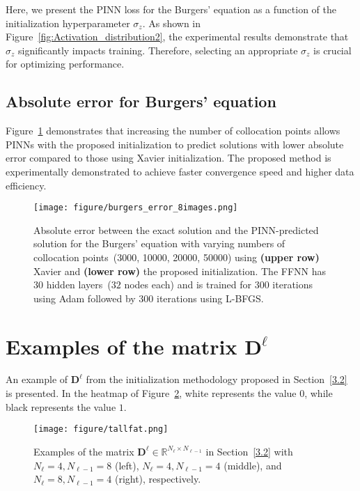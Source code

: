 \documentclass{article} \usepackage{iclr2025_conference,times}
\begin{document}
Here, we present the PINN loss for the Burgers' equation as a function of the initialization hyperparameter \( \sigma_z \). As shown in Figure~\ref{fig:Activation_distribution2}, the experimental results demonstrate that \( \sigma_z \) significantly impacts training. Therefore, selecting an appropriate \( \sigma_z \) is crucial for optimizing performance.


\subsection{Absolute error for Burgers' equation}\label{ae_burgers}

Figure~\ref{fig:burgers_8images} demonstrates that increasing the number of collocation points allows PINNs with the proposed initialization to predict solutions with lower absolute error compared to those using Xavier initialization. The proposed method is experimentally demonstrated to achieve faster convergence speed and higher data efficiency.



\begin{figure}[h!]
\centering 
\texttt{[image: figure/burgers\_error\_8images.png]}
\caption{
Absolute error between the exact solution and the PINN-predicted solution for the Burgers' equation with varying numbers of collocation points~(3000, 10000, 20000, 50000) using \textbf{(upper row)} Xavier and \textbf{(lower row)} the proposed initialization. The FFNN has 30 hidden layers~($32$ nodes each) and is trained for $300$ iterations using Adam followed by $300$ iterations using L-BFGS.}
\label{fig:burgers_8images}
\end{figure}





\section{Examples of the matrix $\mathbf{D}^{\ell}$}\label{initial}

An example of \( \mathbf{D}^{\ell} \) from the initialization methodology proposed in Section~\ref{3.2} is presented. In the heatmap of Figure~\ref{fig:fattall}, white represents the value $0$, while black represents the value $1$.

\begin{figure}[h!]
\centering 
\texttt{[image: figure/tallfat.png]}
\caption{Examples of the matrix \( \mathbf{D}^{\ell} \in \mathbb{R}^{N_{\ell} \times N_{\ell-1}} \) in Section~\ref{3.2} with \( N_{\ell} = 4, N_{\ell-1}=8 \) (left), \( N_{\ell} = 4, N_{\ell-1}=4 \) (middle), and \( N_{\ell} = 8, N_{\ell-1}=4 \) (right), respectively.}
\label{fig:fattall}
\end{figure}
\end{document}
